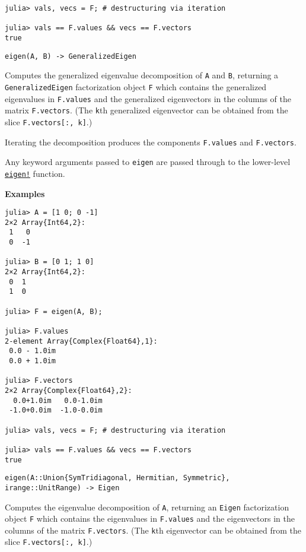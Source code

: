 \begin{adjustwidth}{2em}{0pt}
\begin{verbatim}
julia> vals, vecs = F; # destructuring via iteration

julia> vals == F.values && vecs == F.vectors
true
\end{verbatim}




\begin{lstlisting}
eigen(A, B) -> GeneralizedEigen
\end{lstlisting}

Computes the generalized eigenvalue decomposition of \texttt{A} and \texttt{B}, returning a \texttt{GeneralizedEigen} factorization object \texttt{F} which contains the generalized eigenvalues in \texttt{F.values} and the generalized eigenvectors in the columns of the matrix \texttt{F.vectors}. (The \texttt{k}th generalized eigenvector can be obtained from the slice \texttt{F.vectors[:, k]}.)

Iterating the decomposition produces the components \texttt{F.values} and \texttt{F.vectors}.

Any keyword arguments passed to \texttt{eigen} are passed through to the lower-level \hyperlink{11207008815152064958}{\texttt{eigen!}} function.

\textbf{Examples}


\begin{verbatim}
julia> A = [1 0; 0 -1]
2×2 Array{Int64,2}:
 1   0
 0  -1

julia> B = [0 1; 1 0]
2×2 Array{Int64,2}:
 0  1
 1  0

julia> F = eigen(A, B);

julia> F.values
2-element Array{Complex{Float64},1}:
 0.0 - 1.0im
 0.0 + 1.0im

julia> F.vectors
2×2 Array{Complex{Float64},2}:
  0.0+1.0im   0.0-1.0im
 -1.0+0.0im  -1.0-0.0im

julia> vals, vecs = F; # destructuring via iteration

julia> vals == F.values && vecs == F.vectors
true
\end{verbatim}




\begin{lstlisting}
eigen(A::Union{SymTridiagonal, Hermitian, Symmetric}, irange::UnitRange) -> Eigen
\end{lstlisting}

Computes the eigenvalue decomposition of \texttt{A}, returning an \texttt{Eigen} factorization object \texttt{F} which contains the eigenvalues in \texttt{F.values} and the eigenvectors in the columns of the matrix \texttt{F.vectors}. (The \texttt{k}th eigenvector can be obtained from the slice \texttt{F.vectors[:, k]}.)


\end{adjustwidth}
